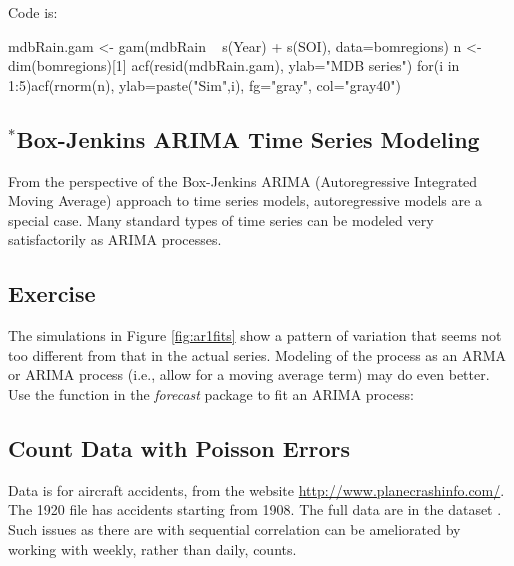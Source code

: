 Code is:
\begin{Schunk}
\begin{Sinput}
mdbRain.gam <- gam(mdbRain ~ s(Year) + s(SOI),
                   data=bomregions)
n <-  dim(bomregions)[1]
acf(resid(mdbRain.gam), ylab="MDB series")
for(i in 1:5)acf(rnorm(n), ylab=paste("Sim",i),
                 fg="gray", col="gray40")
\end{Sinput}
\end{Schunk}

\subsection{$^*$Box-Jenkins ARIMA Time Series Modeling}

From the perspective of the Box-Jenkins ARIMA (Autoregressive
Integrated Moving Average) approach to time series models,
autoregressive models are a special case.  Many standard types of time
series can be modeled very satisfactorily as ARIMA processes.

\subsection*{Exercise}
The simulations in Figure \ref{fig:ar1fits} show a pattern of
  variation that seems not too different from that in the actual series.
  Modeling of the process as an ARMA or ARIMA process (i.e., allow
  for a moving average term) may do even better.  Use the
   function in the {\em forecast} package to fit an
  ARIMA process:

\subsection{Count Data with Poisson Errors}

Data is for aircraft accidents, from the website
\url{http://www.planecrashinfo.com/}.  The 1920 file has
accidents starting from 1908. The full data are in the
dataset .
Such issues as there are with sequential correlation
can be ameliorated by working with weekly, rather than daily,
counts. 



